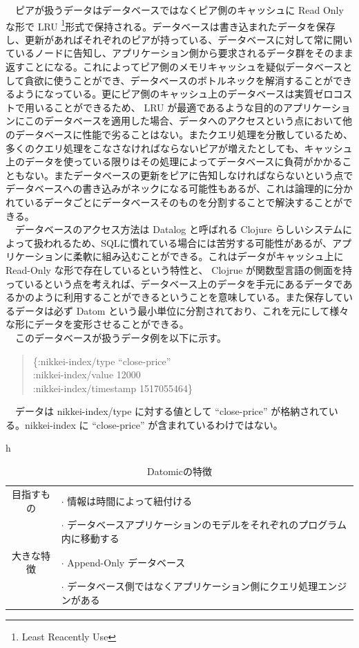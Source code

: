 \documentclass{scrartcl}
\begin{document}
　ピアが扱うデータはデータベースではなくピア側のキャッシュに Read Only な形で LRU \footnote{Least Reacently Use}形式で保持される。データベースは書き込まれたデータを保存し、更新があればそれぞれのピアが持っている、データベースに対して常に開いているノードに告知し、アプリケーション側から要求されるデータ群をそのまま返すことになる。これによってピア側のメモリキャッシュを疑似データベースとして貪欲に使うことができ、データベースのボトルネックを解消することができるようになっている。更にピア側のキャッシュ上のデータベースは実質ゼロコストで用いることができるため、 LRU が最適であるような目的のアプリケーションにこのデータベースを適用した場合、データへのアクセスという点において他のデータベースに性能で劣ることはない。またクエリ処理を分散しているため、多くのクエリ処理をこなさなければならないピアが増えたとしても、キャッシュ上のデータを使っている限りはその処理によってデータベースに負荷がかかることもない。またデータベースの更新をピアに告知しなければならないという点でデータベースへの書き込みがネックになる可能性もあるが、これは論理的に分かれているデータごとにデータベースそのものを分割することで解決することができる。\\
　データベースのアクセス方法は Datalog と呼ばれる Clojure らしいシステムによって扱われるため、SQLに慣れている場合には苦労する可能性があるが、アプリケーションに柔軟に組み込むことができる。これはデータがキャッシュ上に Read-Only な形で存在しているという特性と、 Clojrue が関数型言語の側面を持っているという点を考えれば、データベース上のデータを手元にあるデータであるかのように利用することができるということを意味している。また保存しているデータは必ず Datom という最小単位に分割されており、これを元にして様々な形にデータを変形させることができる。\\
　このデータベースが扱うデータ例を以下に示す。\\

\begin{verse}
\{:nikkei-index/type ``close-price''\\
\hspace*{1em}:nikkei-index/value 12000\\
\hspace*{1em}:nikkei-index/timestamp 1517055464\}\\
\end{verse}
　データは nikkei-index/type に対する値として ``close-price'' が格納されている。nikkei-index に ``close-price'' が含まれているわけではない。\\

\begin{table}{h}
\caption{Datomicの特徴}
\centering
\begin{tabular}{|c|l|}
\hline
目指すもの & \(\cdot\) 情報は時間によって紐付ける\\
 & \(\cdot\) データベースアプリケーションのモデルをそれぞれのプログラム内に移動する\\
\hline
大きな特徴 & \(\cdot\) Append-Only データベース\\
 & \(\cdot\) データベース側ではなくアプリケーション側にクエリ処理エンジンがある\\
\hline
\end{tabular}
\end{table}
\end{document}
